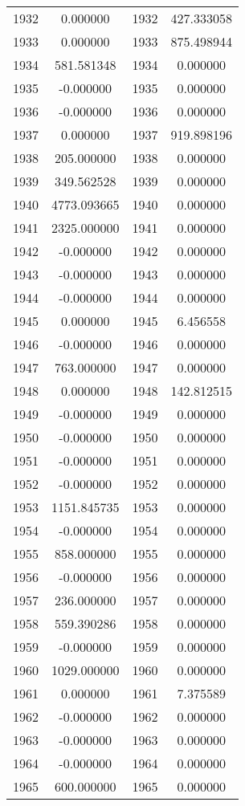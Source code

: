 \documentclass[12pt]{article}
\begin{document}
\begin{longtable}{@{}cccc@{}}
1932 & 0.000000 & 1932 & 427.333058 \\
1933 & 0.000000 & 1933 & 875.498944 \\
1934 & 581.581348 & 1934 & 0.000000 \\
1935 & -0.000000 & 1935 & 0.000000 \\
1936 & -0.000000 & 1936 & 0.000000 \\
1937 & 0.000000 & 1937 & 919.898196 \\
1938 & 205.000000 & 1938 & 0.000000 \\
1939 & 349.562528 & 1939 & 0.000000 \\
1940 & 4773.093665 & 1940 & 0.000000 \\
1941 & 2325.000000 & 1941 & 0.000000 \\
1942 & -0.000000 & 1942 & 0.000000 \\
1943 & -0.000000 & 1943 & 0.000000 \\
1944 & -0.000000 & 1944 & 0.000000 \\
1945 & 0.000000 & 1945 & 6.456558 \\
1946 & -0.000000 & 1946 & 0.000000 \\
1947 & 763.000000 & 1947 & 0.000000 \\
1948 & 0.000000 & 1948 & 142.812515 \\
1949 & -0.000000 & 1949 & 0.000000 \\
1950 & -0.000000 & 1950 & 0.000000 \\
1951 & -0.000000 & 1951 & 0.000000 \\
1952 & -0.000000 & 1952 & 0.000000 \\
1953 & 1151.845735 & 1953 & 0.000000 \\
1954 & -0.000000 & 1954 & 0.000000 \\
1955 & 858.000000 & 1955 & 0.000000 \\
1956 & -0.000000 & 1956 & 0.000000 \\
1957 & 236.000000 & 1957 & 0.000000 \\
1958 & 559.390286 & 1958 & 0.000000 \\
1959 & -0.000000 & 1959 & 0.000000 \\
1960 & 1029.000000 & 1960 & 0.000000 \\
1961 & 0.000000 & 1961 & 7.375589 \\
1962 & -0.000000 & 1962 & 0.000000 \\
1963 & -0.000000 & 1963 & 0.000000 \\
1964 & -0.000000 & 1964 & 0.000000 \\
1965 & 600.000000 & 1965 & 0.000000 \\

\end{longtable}
\end{document}
